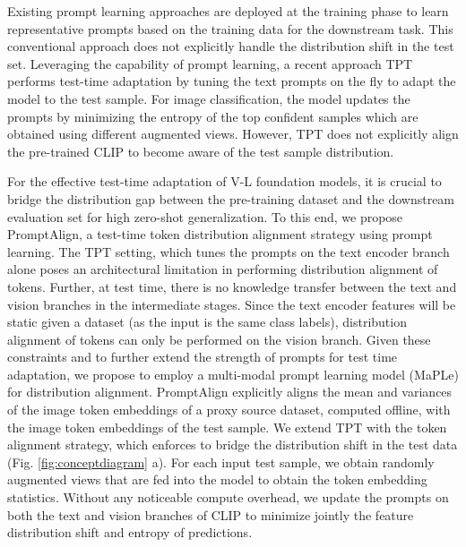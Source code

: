 \documentclass[a4paper]{article}
\begin{document}
Existing prompt learning approaches are deployed at the training phase to learn representative prompts based on the training data for the downstream task. This conventional approach does not explicitly handle the distribution shift in the test set. Leveraging the capability of prompt learning, a recent approach TPT \cite{shu2022test} performs test-time adaptation by tuning the text prompts on the fly to adapt the model to the test sample. For image classification, the model updates the prompts by minimizing the entropy of the top confident samples which are obtained using different augmented views. 
However, TPT does not explicitly align the pre-trained CLIP to become aware of the test sample distribution.



For the effective test-time adaptation of V-L foundation models, it is crucial to bridge the distribution gap between the pre-training dataset and the downstream evaluation set for high zero-shot generalization. To this end, we propose PromptAlign, a test-time token distribution alignment strategy using prompt learning. The TPT setting, which tunes the prompts on the text encoder branch alone poses an architectural limitation in performing distribution alignment of tokens. Further, at test time, there is no knowledge transfer between the text and vision branches in the intermediate stages. Since the text encoder features will be static given a dataset (as the input is the same class labels), distribution alignment of tokens can only be performed on the vision branch. Given these constraints and to further extend the strength of prompts for test time adaptation, we propose to employ a multi-modal prompt learning model (MaPLe) \cite{khattakMaPLe}  for distribution alignment. PromptAlign explicitly aligns the mean and variances of the image token embeddings of a proxy source dataset, computed offline, with the image token embeddings of the test sample. We extend TPT with the token alignment strategy, which enforces to bridge the distribution shift in the test data (Fig. \ref{fig:conceptdiagram} a). For each input test sample, we obtain randomly augmented views that are fed into the model to obtain the token embedding statistics. Without any noticeable compute overhead, we update the prompts on both the text and vision branches of CLIP to minimize jointly the feature distribution shift and entropy of predictions. 
\end{document}
